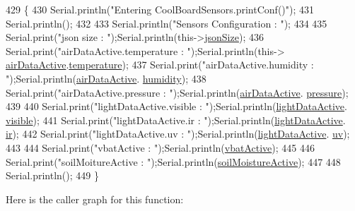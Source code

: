 \begin{DoxyCode}
429 \{
430     Serial.println(\textcolor{stringliteral}{"Entering CoolBoardSensors.printConf()"});
431     Serial.println();
432 
433     Serial.println(\textcolor{stringliteral}{"Sensors Configuration : "});
434     
435     Serial.print(\textcolor{stringliteral}{"json size : "});Serial.println(this->\hyperlink{classCoolBoardSensors_a05a40dc80bfff14ffb830f549b876f8d}{jsonSize});
436     Serial.print(\textcolor{stringliteral}{"airDataActive.temperature : "});Serial.println(this->
      \hyperlink{classCoolBoardSensors_abff8dfeccb2f7689847bb64d5f1cd31e}{airDataActive}.\hyperlink{structCoolBoardSensors_1_1airActive_a9a6633c426b0508e30ebc1832ec6d745}{temperature});
437     Serial.print(\textcolor{stringliteral}{"airDataActive.humidity : "});Serial.println(\hyperlink{classCoolBoardSensors_abff8dfeccb2f7689847bb64d5f1cd31e}{airDataActive}.
      \hyperlink{structCoolBoardSensors_1_1airActive_ae5740445054b27415e22f450576accb7}{humidity});
438     Serial.print(\textcolor{stringliteral}{"airDataActive.pressure : "});Serial.println(\hyperlink{classCoolBoardSensors_abff8dfeccb2f7689847bb64d5f1cd31e}{airDataActive}.
      \hyperlink{structCoolBoardSensors_1_1airActive_ab200826a70d1dc9945f5efb6b9c732ed}{pressure});
439 
440     Serial.print(\textcolor{stringliteral}{"lightDataActive.visible : "});Serial.println(\hyperlink{classCoolBoardSensors_ac4deb1cf41bac8b91c780c92fab00ba4}{lightDataActive}.
      \hyperlink{structCoolBoardSensors_1_1lightActive_abcbba296b6a95e67c0cd2555d9dd50c7}{visible});
441     Serial.print(\textcolor{stringliteral}{"lightDataActive.ir : "});Serial.println(\hyperlink{classCoolBoardSensors_ac4deb1cf41bac8b91c780c92fab00ba4}{lightDataActive}.
      \hyperlink{structCoolBoardSensors_1_1lightActive_a67700895349b95ceb263f1a6da756315}{ir});
442     Serial.print(\textcolor{stringliteral}{"lightDataActive.uv : "});Serial.println(\hyperlink{classCoolBoardSensors_ac4deb1cf41bac8b91c780c92fab00ba4}{lightDataActive}.
      \hyperlink{structCoolBoardSensors_1_1lightActive_a949a7aaf5166d981de8fe0fd93da20d6}{uv});
443     
444     Serial.print(\textcolor{stringliteral}{"vbatActive : "});Serial.println(\hyperlink{classCoolBoardSensors_af5039ad760b0ff0aa7eee16c55e81702}{vbatActive});
445 
446     Serial.print(\textcolor{stringliteral}{"soilMoitureActive : "});Serial.println(\hyperlink{classCoolBoardSensors_a31983eecc0f9cd000e1f912206ea4dc8}{soilMoistureActive});
447 
448     Serial.println();
449 \}
\end{DoxyCode}
Here is the caller graph for this function\+:\nopagebreak
